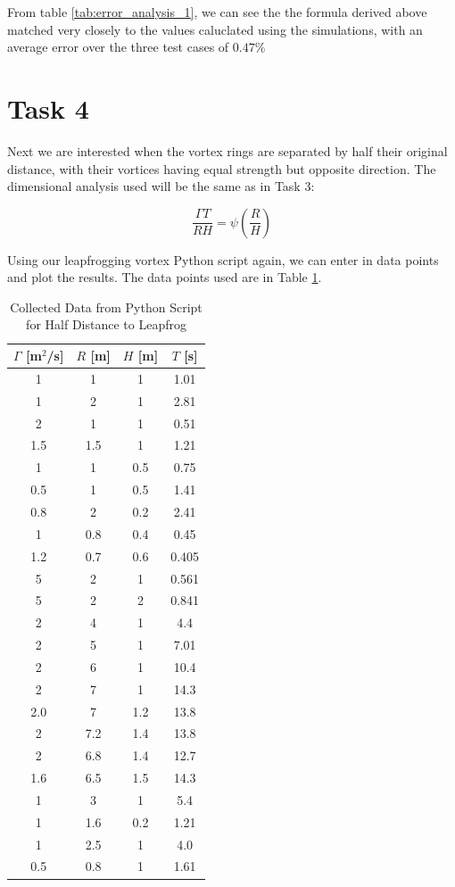 \documentclass[10pt]{article}
\begin{document}
From table \ref{tab:error_analysis_1}, we can see the the formula derived above matched very closely to the values caluclated using the simulations, with an average error over the three test cases of $\mathbf{0.47\%}$

\section{Task 4}
Next we are interested when the vortex rings are separated by half their original distance, with their vortices having equal strength but opposite direction. The dimensional analysis used will be the same as in Task 3:

\[\frac{\Gamma T}{RH}=\psi\left(\frac{R}{H} \right)\]

Using our leapfrogging vortex Python script again, we can enter in data points and plot the results. The data points used are in Table \ref{tab:data2}.

\begin{table}[H]
    \centering
    \begin{tabular}{c c c c}
    $\Gamma$ [m$^2$/s]& $R$ [m]& $H$ [m]& $T$ [s] \\ \hline
    1 & 1 & 1 & 1.01 \\
    1 & 2 & 1 & 2.81 \\
    2 & 1 & 1 & 0.51 \\
    1.5 & 1.5 & 1 & 1.21 \\
    1 & 1 & 0.5 & 0.75 \\
    0.5 & 1 & 0.5 & 1.41 \\
    0.8 & 2 & 0.2 & 2.41 \\
    1 & 0.8 & 0.4 & 0.45\\
    1.2 & 0.7 & 0.6 & 0.405 \\
    5 & 2 & 1 & 0.561 \\
    5 & 2 & 2 & 0.841 \\
    2 & 4 & 1 & 4.4 \\
    2 & 5 & 1 & 7.01 \\
    2 & 6 & 1 & 10.4 \\
    2 & 7 & 1 & 14.3 \\
    2.0 & 7 & 1.2 & 13.8 \\
    2 & 7.2 & 1.4 &  13.8 \\
    2 & 6.8 & 1.4 &  12.7 \\
    1.6 & 6.5 & 1.5 & 14.3 \\
    1 & 3 & 1 & 5.4 \\
    1 & 1.6 & 0.2 & 1.21 \\
    1 & 2.5 & 1 & 4.0 \\
    0.5 & 0.8 & 1 & 1.61 \\
    \end{tabular}
    \caption{Collected Data from Python Script for Half Distance to Leapfrog}
    \label{tab:data2}
\end{table}
\end{document}
